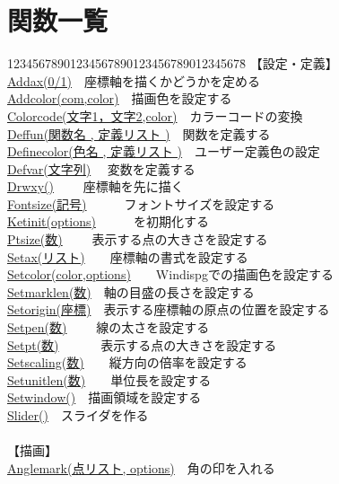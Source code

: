 \documentclass[papersize,a4paper,12pt,uplatex]{jsarticle}
\begin{document}
\section{関数一覧}
\begin{tabbing}
12345678901234567890123456789012345678\=\kill
【設定・定義】\\
\hyperlink{addax}{Addax(0/1)}　\>座標軸を描くかどうかを定める\\
\hyperlink{addcolor}{Addcolor(com,color)}　\>描画色を設定する\\
\hyperlink{colorcode}{Colorcode(文字1，文字2,color)}　\>カラーコードの変換\\
\hyperlink{deffun}{Deffun(関数名 , 定義リスト )}　\>関数を定義する\\
\hyperlink{definecolor}{Definecolor(色名 , 定義リスト )}　\>ユーザー定義色の設定\\
\hyperlink{defvar}{Defvar(文字列)} 　\>変数を定義する\\
\hyperlink{drwxy}{Drwxy()} 　　\>座標軸を先に描く\\
\hyperlink{fontsize}{Fontsize(記号)}　　　\>フォントサイズを設定する\\
\hyperlink{ketint}{Ketinit(options)}　　　\>\ketcindy を初期化する\\
\hyperlink{ptsie}{Ptsize(数)}   　　\>表示する点の大きさを設定する\\
\hyperlink{setax}{Setax(リスト)}　　\>座標軸の書式を設定する\\
\hyperlink{setcolor}{Setcolor(color,options)}　　\>Windispgでの描画色を設定する\\
\hyperlink{setmarklen}{Setmarklen(数)}　\>軸の目盛の長さを設定する\\
\hyperlink{setorigin}{Setorigin(座標)}　\>表示する座標軸の原点の位置を設定する\\
\hyperlink{setpen}{Setpen(数)}  　　\>線の太さを設定する\\
\hyperlink{setpt}{Setpt(数)}    　　　\>表示する点の大きさを設定する\\
\hyperlink{setscaling}{Setscaling(数)}　　\>縦方向の倍率を設定する\\
\hyperlink{setunitlen}{Setunitlen(数)}　　\>単位長を設定する\\
\hyperlink{setwindow}{Setwindow()}　\>描画領域を設定する\\
\hyperlink{slider}{Slider()}　\>スライダを作る\\
\\
【描画】\\
\hyperlink{anglemark}{Anglemark(点リスト, options)}　\>角の印を入れる\\

\end{tabbing}
\end{document}
